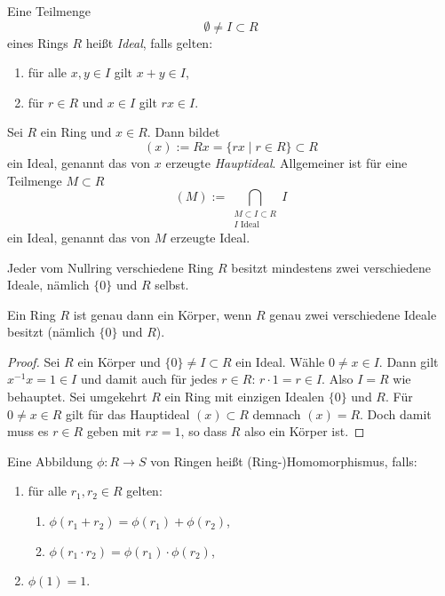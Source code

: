 \documentclass{book}
\begin{document}
\begin{defi}
    \label{defi:ideal}
    Eine Teilmenge
    \[
        \emptyset \ne I \subset R
    \]
    eines Rings $R$ heißt {\em Ideal}, falls gelten:
    \begin{enumerate}
        \item für alle $x,y \in I$ gilt $x + y \in I$,
        \item für $r \in R$ und $x \in I$ gilt $rx \in I$. 
    \end{enumerate}
\end{defi}

\begin{exa}
    \label{exa:hauptideal}
    Sei $R$ ein Ring und $x \in R$. Dann bildet
    \[
        (x) := Rx = \{ rx \; | \; r \in R \} \subset R
    \] 
    ein Ideal, genannt das von $x$ erzeugte \emph{Hauptideal}. Allgemeiner ist für eine Teilmenge $M \subset R$
    \[
        (M) := \bigcap_{\substack{M \subset I \subset R\\\text{$I$ Ideal}}} I
    \] 
    ein Ideal, genannt das von $M$ erzeugte Ideal. 
\end{exa}

Jeder vom Nullring verschiedene Ring $R$ besitzt mindestens zwei verschiedene
Ideale, nämlich $\{0\}$ und $R$ selbst. 

\begin{prop}
    \label{prop:koerper}
    Ein Ring $R$ ist genau dann ein Körper, wenn $R$ genau zwei verschiedene
    Ideale besitzt (nämlich $\{0\}$ und $R$).
\end{prop}
\begin{proof}
    Sei $R$ ein Körper und $\{0\} \ne I \subset R$ ein Ideal. Wähle $0 \ne x
    \in I$. Dann gilt $x^{-1} x = 1 \in I$ und damit auch für jedes $r \in R$:
    $r \cdot 1 = r \in I$. Also $I = R$ wie behauptet. Sei umgekehrt $R$ ein
    Ring mit einzigen Idealen $\{0\}$ und $R$. Für $0 \ne x \in R$ gilt für das
    Hauptideal $(x) \subset R$ demnach $(x) = R$. Doch damit muss es $r \in R$
    geben mit $r x = 1$, so dass $R$ also ein Körper ist. 
\end{proof}

\begin{defi}
    \label{defi:rhom}
    Eine Abbildung $\phi: R \to S$ von Ringen heißt (Ring-)Homomorphismus, falls:
    \begin{enumerate}
        \item für alle $r_1,r_2 \in R$ gelten:
            \begin{enumerate}
                \item $\phi(r_1 + r_2) = \phi(r_1) + \phi(r_2)$,
                \item $\phi(r_1 \cdot r_2) = \phi(r_1) \cdot \phi(r_2)$,
            \end{enumerate}
        \item $\phi(1) = 1$. 
    \end{enumerate}
\end{defi}
\end{document}
